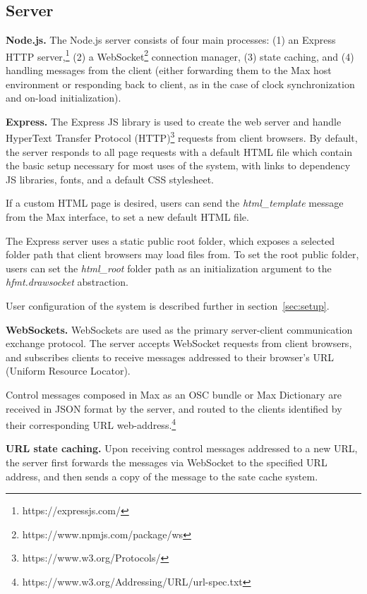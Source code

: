 \subsection{Server}
\noindent
\textbf{Node.js.}
The Node.js server consists of four main processes: (1) an Express HTTP server,\footnote{https://expressjs.com/} (2) a WebSocket\footnote{https://www.npmjs.com/package/ws} connection manager, (3) state caching, and (4) handling messages from the client (either forwarding them to the Max host environment or responding back to client,  as in the case of clock synchronization and on-load initialization).

\medskip
\noindent
\textbf{Express.}
The Express JS library is used to create the web server and handle HyperText Transfer Protocol (HTTP)\footnote{https://www.w3.org/Protocols/} requests from client browsers. 
By default, the server responds to all page requests with a default HTML file which contain the basic setup necessary for most uses of the \drawsocket system, with links to dependency JS libraries, fonts, and a default CSS stylesheet.

If a custom HTML page is desired, users can send the \textit{html\_template} message from the Max interface, to set a new default HTML file.

The Express server uses a static public root folder, which exposes a selected folder path that client browsers may load files from. 
To set the root public folder, users can set the \textit{html\_root} folder path as an initialization argument to the \textit{hfmt.drawsocket} abstraction.

User configuration of the system is described further in section~\ref{sec:setup}.

\medskip
\noindent
\textbf{WebSockets.}
WebSockets are used as the primary server-client communication exchange protocol.
The server accepts WebSocket requests from client browsers, and subscribes clients to receive messages addressed to their browser's URL (Uniform Resource Locator).

Control messages composed in Max as an OSC bundle or Max Dictionary are received in JSON format by the server, and routed to the clients identified by their corresponding URL web-address.\footnote{https://www.w3.org/Addressing/URL/url-spec.txt}

\medskip
\noindent
\textbf{URL state caching.}
Upon receiving control messages addressed to a new URL, the server first forwards the messages via WebSocket to the specified URL address, and then sends a copy of the message to the sate cache system.

